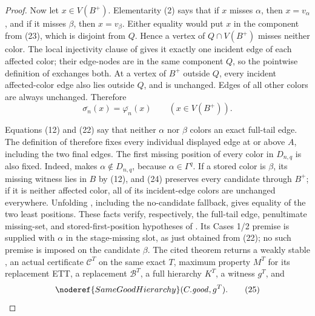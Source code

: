 \begin{proof}
Now let \(x\in V(B^+)\).  Elementarity (2) says that if \(x\) misses
\(\alpha\), then \(x=v_\alpha\), and if it misses \(\beta\), then
\(x=v_\beta\).  Either equality would put \(x\) in the component from
(23), which is disjoint from \(Q\).  Hence a vertex of
\(Q\cap V(B^+)\) misses neither color.
The local injectivity clause of  gives it
exactly one incident edge of each affected color; their edge-nodes are in
the same component \(Q\), so the pointwise definition of
 exchanges both.  At a vertex of \(B^+\)
outside \(Q\), every incident affected-color edge also lies outside \(Q\),
and is unchanged.  Edges of all other colors are always unchanged.
Therefore
\[
 \overline{\sigma_n}(x)=\overline{\varphi_n}(x)
          \qquad(x\in V(B^+)).                                \tag{24}
\]

Equations (12) and (22) say that neither \(\alpha\) nor \(\beta\) colors
an exact full-tail edge.  The definition of
 therefore fixes every individual displayed
edge at or above \(A\), including the two final edges.  The first missing
position of every color in \(D_{n,q}\) is also fixed.  Indeed,
 makes \(\alpha\notin D_{n,q}\),
because \(\alpha\in\Gamma^q\).  If a stored color is \(\beta\), its
missing witness lies in \(B\) by (12), and (24) preserves every candidate
through \(B^+\); if it is neither affected color, all of its incident-edge
colors are unchanged everywhere.  Unfolding
, including the no-candidate
fallback, gives equality of the two least positions.  These facts verify,
respectively, the full-tail edge, penultimate missing-set, and
stored-first-position hypotheses of
.  Its Cases 1/2 premise is
supplied with \(\alpha\) in the stage-missing slot, as just obtained from
(22); no such premise is imposed on the candidate \(\beta\).  The cited
theorem returns a weakly stable , an actual
 certificate \(\mathcal C^T\)
on the same exact \(T\), maximum property \(M^T\) for its replacement ETT,
a replacement  \(\mathcal B^T\), a full hierarchy
\(K^T\), a  witness \(g^T\), and
\[
                 \noderef{SameGoodHierarchy}(C.\mathit{good},g^T). \tag{25}
\]


\end{proof}
